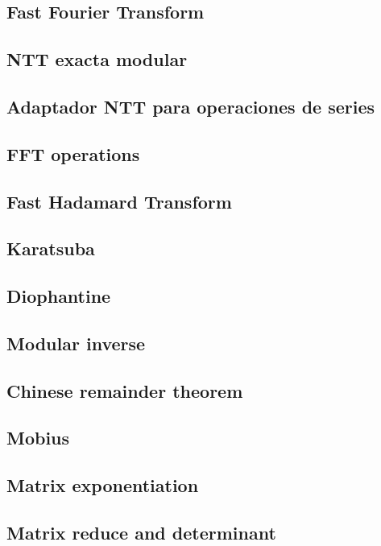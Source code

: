 \subsection{Fast Fourier Transform}
\subsection{NTT exacta modular}
\subsection{Adaptador NTT para operaciones de series}
\subsection{FFT operations}
\subsection{Fast Hadamard Transform}
\subsection{Karatsuba}
\subsection{Diophantine}
\subsection{Modular inverse}
\subsection{Chinese remainder theorem}
\subsection{Mobius}
\subsection{Matrix exponentiation}
\subsection{Matrix reduce and determinant}
